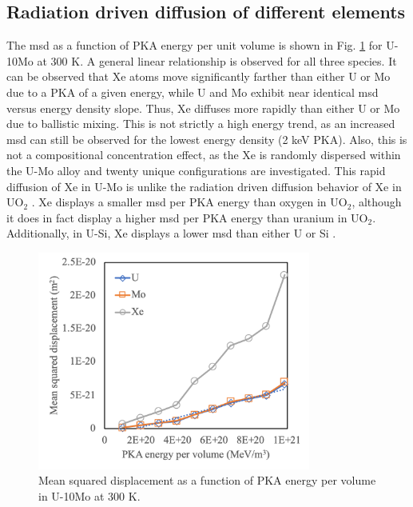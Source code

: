 \documentclass[review]{elsarticle}
\begin{document}
\subsection{Radiation driven diffusion of different elements}

The msd as a function of PKA energy per unit volume is shown in Fig. \ref{fig:epsB_temp} for U-10Mo at 300 K. A general linear relationship is observed for all three species. It can be observed that Xe atoms move significantly farther than either U or Mo due to a PKA of a given energy, while U and Mo exhibit near identical msd versus energy density slope. Thus, Xe diffuses more rapidly than either U or Mo due to ballistic mixing. This is not strictly a high energy trend, as an increased msd can still be observed for the lowest energy density (2 keV PKA). Also, this is not a compositional concentration effect, as the Xe is randomly dispersed within the U-Mo alloy and twenty unique configurations are investigated. This rapid diffusion of Xe in U-Mo is unlike the radiation driven diffusion behavior of Xe in UO$_2$ \cite{cooper2016}. Xe displays a smaller msd per PKA energy than oxygen in UO$_2$, although it does in fact display a higher msd per PKA energy than uranium in UO$_2$. Additionally, in U-Si, Xe displays a lower msd than either U or Si \cite{cooperUSidiff}. 

\begin{figure}[h]
 \centering
 \includegraphics[width=0.8\textwidth]{epsB.png} 
 \caption{Mean squared displacement as a function of PKA energy per volume in U-10Mo at 300 K.}
 \label{fig:epsB_temp}
\end{figure}
\end{document}
